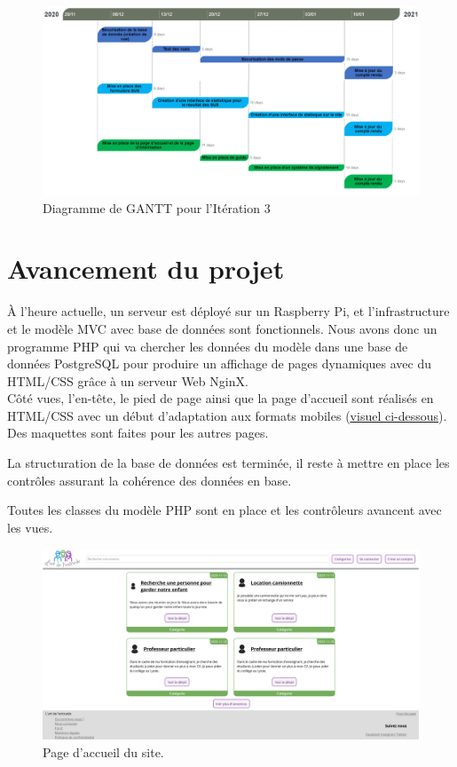 \documentclass[a4paper,11pt]{article}
\begin{document}
\begin{figure}[H]
  \includegraphics[width=\linewidth]{images/gantt-iteration3.png}
  \caption{Diagramme de GANTT pour l'Itération 3}
  \label{fig:gantt-iteration3}
\end{figure}



\section{Avancement du projet}

À l'heure actuelle, un serveur est déployé sur un Raspberry Pi, et l'infrastructure et le modèle MVC
avec base de données sont fonctionnels. Nous avons donc un programme PHP qui va chercher les
données du modèle dans une base de données PostgreSQL pour produire un affichage de pages
dynamiques avec du HTML/CSS grâce à un serveur Web NginX.\\

Côté vues, l'en-tête, le pied de page ainsi que la page d'accueil sont réalisés en
HTML/CSS avec un début d'adaptation aux formats mobiles (\underline{\hyperref[fig:page-accueil]{visuel ci-dessous}}). Des maquettes sont faites pour les autres pages.

La structuration de la base de données est terminée, il reste à mettre en place les contrôles
assurant la cohérence des données en base.

Toutes les classes du modèle PHP sont en place et les contrôleurs avancent avec les vues.

\begin{figure}[H]
  \includegraphics[width=\linewidth]{images/page-accueil.png}
  \caption{Page d'accueil du site.}
  \label{fig:page-accueil}
\end{figure}
\end{document}
